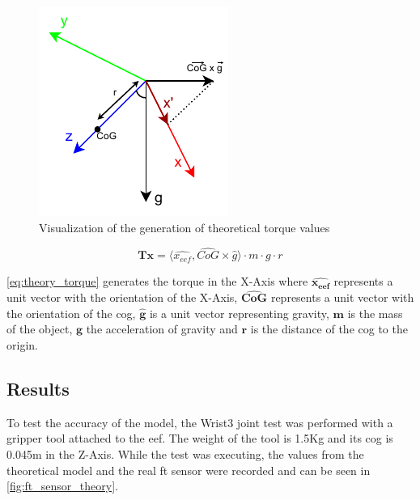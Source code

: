 \begin{figure}[h]
    \centering
    \includegraphics[width=0.35\linewidth]{figs/chp3/ft_theory_torque.pdf}
    \caption{Visualization of the generation of theoretical torque values}
    \label{fig:ft_theory_torque}
\end{figure}

\begin{figure}[h]
    \begin{equation}
        \mathbf{Tx} = \langle\hat{x_{eef}} , \hat{CoG} \times \hat{g} \rangle \cdot m \cdot g\cdot r
        \label{eq:theory_torque}
    \end{equation}
\end{figure}

\par \autoref{eq:theory_torque} generates the torque in the X-Axis where $\mathbf{\hat{x_{eef}}}$ represents a unit vector with the orientation of the X-Axis, $\mathbf{\hat{CoG}}$ represents a unit vector with the orientation of the \ac{cog}, $\mathbf{\hat{g}}$ is a unit vector representing gravity, $\mathbf{m}$ is the mass of the object, $\mathbf{g}$ the acceleration of gravity and $\mathbf{r}$ is the distance of the \ac{cog} to the origin.



\subsection{Results}
\label{ssec:ft_theory_results}

\par To test the accuracy of the model, the Wrist3 joint test was performed with a gripper tool attached to the \ac{eef}. The weight of the tool is 1.5Kg and its \ac{cog} is 0.045m in the Z-Axis. While the test was executing, the values from the theoretical model and the real \ac{ft} sensor were recorded and can be seen in \autoref{fig:ft_sensor_theory}.

